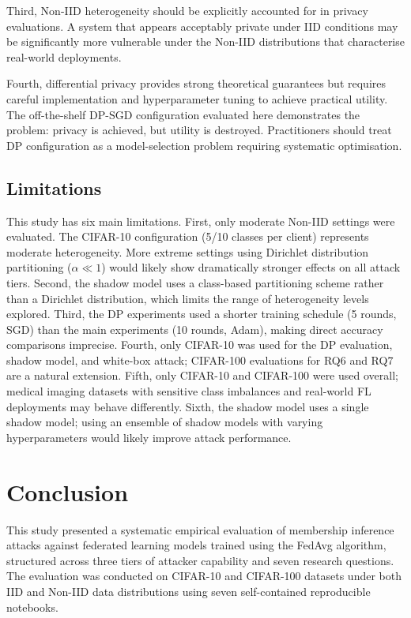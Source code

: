 \documentclass[12pt, a4paper]{report}
\begin{document}
Third, Non-IID heterogeneity should be explicitly accounted for in privacy
evaluations. A system that appears acceptably private under IID conditions may
be significantly more vulnerable under the Non-IID distributions that characterise
real-world deployments.

Fourth, differential privacy provides strong theoretical guarantees but requires
careful implementation and hyperparameter tuning to achieve practical utility.
The off-the-shelf DP-SGD configuration evaluated here demonstrates the problem:
privacy is achieved, but utility is destroyed. Practitioners should treat DP
configuration as a model-selection problem requiring systematic optimisation.

\section{Limitations}

This study has six main limitations. First, only moderate Non-IID settings were
evaluated. The CIFAR-10 configuration (5/10 classes per client) represents
moderate heterogeneity. More extreme settings using Dirichlet distribution
partitioning ($\alpha \ll 1$) would likely show dramatically stronger effects
on all attack tiers. Second, the shadow model uses a class-based partitioning
scheme rather than a Dirichlet distribution, which limits the range of
heterogeneity levels explored. Third, the DP experiments used a shorter training
schedule (5 rounds, SGD) than the main experiments (10 rounds, Adam), making
direct accuracy comparisons imprecise. Fourth, only CIFAR-10 was used for the
DP evaluation, shadow model, and white-box attack; CIFAR-100 evaluations for
RQ6 and RQ7 are a natural extension. Fifth, only CIFAR-10 and CIFAR-100 were
used overall; medical imaging datasets with sensitive class imbalances and
real-world FL deployments may behave differently. Sixth, the shadow model uses
a single shadow model; using an ensemble of shadow models with varying
hyperparameters would likely improve attack performance.

\chapter{Conclusion}

This study presented a systematic empirical evaluation of membership inference
attacks against federated learning models trained using the FedAvg algorithm,
structured across three tiers of attacker capability and seven research questions.
The evaluation was conducted on CIFAR-10 and CIFAR-100 datasets under both IID
and Non-IID data distributions using seven self-contained reproducible notebooks.
\end{document}
